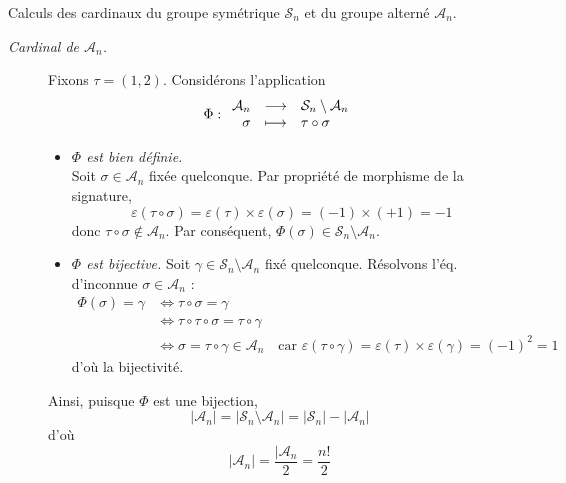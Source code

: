 \documentclass{article}
\begin{document}
\begin{question_kholle}{Calculs des cardinaux du groupe symétrique $\mathcal{S}_{n}$ et du groupe alterné $\mathcal{A}_{n}$.}
\begin{description}
		\item [\textit{Cardinal de $\mathcal{A}_{n}$.}] Fixons $\tau=(1,2)$. Considérons l’application
		      \[
			      \Phi:\begin{array}{rcl} \mathcal{A}_{n} & \longrightarrow & \mathcal{S}_{n}\setminus \mathcal{A}_{n} \\ \sigma & \longmapsto & \tau\circ \sigma \end{array}
		      \]
		      \begin{itemize}
			      \item \textit{$\Phi$ est bien définie.}\\
			            Soit $\sigma\in \mathcal{A}_{n}$ fixée quelconque. Par propriété de morphisme de la signature,
			            \[
				            \varepsilon(\tau\circ \sigma) = \varepsilon(\tau)\times \varepsilon(\sigma) = (-1)\times (+1)= -1
			            \]
			            donc $\tau\circ \sigma\notin \mathcal{A}_{n}$. Par conséquent, $\Phi(\sigma)\in \mathcal{S}_{n}\setminus \mathcal{A}_{n}$.
			      \item \textit{$\Phi$ est bijective.} Soit $\gamma\in \mathcal{S}_{n}\setminus \mathcal{A}_{n}$ fixé quelconque. Résolvons l’éq. d’inconnue $\sigma\in \mathcal{A}_{n}$ :
			            \begin{align*}
				            \Phi(\sigma)=\gamma & \iff  \tau\circ \sigma=\gamma                                                                                                                               \\
				                                & \iff \tau\circ \tau \circ \sigma = \tau\circ \gamma                                                                                                         \\
				                                & \iff  \sigma = \tau\circ \gamma \in\mathcal{A}_{n} \quad\text{car $\varepsilon(\tau\circ \gamma)=\varepsilon(\tau)\times \varepsilon(\gamma) = (-1)^{2}=1$}
			            \end{align*}
			            d’où la bijectivité.
		      \end{itemize}
		      Ainsi, puisque $\Phi$ est une bijection,
		      \[
			      |\mathcal{A}_{n}|=|\mathcal{S}_{n}\setminus \mathcal{A}_{n}| = |\mathcal{S}_{n}| - |\mathcal{A}_{n}|
		      \]
		      d’où
		      \[
			      |\mathcal{A}_{n}| = \frac{|\mathcal{A}_{n}}{2} = \frac{n!}{2}
		      \]

	\end{description}

\end{question_kholle}
\end{document}
